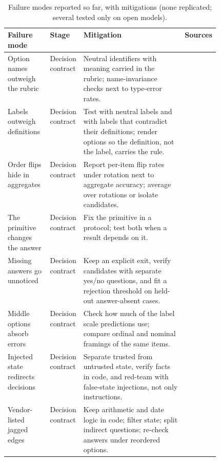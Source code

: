 \begin{table}[tbp]
\centering\footnotesize
\caption{Failure modes reported so far, with mitigations (none replicated; several tested only on open models).}\label{tab:failures}
\begin{tabularx}{\linewidth}{p{0.2\linewidth}p{0.12\linewidth}Xp{0.16\linewidth}}
\toprule
\textbf{Failure mode} & \textbf{Stage} & \textbf{Mitigation} & \textbf{Sources} \\
\midrule
Option names outweigh the rubric & Decision contract & Neutral identifiers with meaning carried in the rubric; name-invariance checks next to type-error rates. & \citep{arxiv2609_26758,arxiv2610_00346} \\
Labels outweigh definitions & Decision contract & Test with neutral labels and with labels that contradict their definitions; render options so the definition, not the label, carries the rule. & \citep{arxiv2610_02586,arxiv2610_03324} \\
Order flips hide in aggregates & Decision contract & Report per-item flip rates under rotation next to aggregate accuracy; average over rotations or isolate candidates. & \citep{gh_jujumilk3_jev_calibration_audit,arxiv2609_30454,arxiv2610_00831,arxiv2610_01601,typesafe2026jaggedness,arxiv2610_07327} \\
The primitive changes the answer & Decision contract & Fix the primitive in a protocol; test both when a result depends on it. & \citep{gh_jujumilk3_jev_calibration_audit,gh_jjd_lab_jev_synthetic_survey,arxiv2609_37470,arxiv2609_35342} \\
Missing answers go unnoticed & Decision contract & Keep an explicit exit, verify candidates with separate yes/\allowbreak{}no questions, and fit a rejection threshold on held-out answer-absent cases. & \citep{arxiv2609_39496,arxiv2610_03387,arxiv2609_34024,gh_jujumilk3_jev_calibration_audit,arxiv2610_07730} \\
Middle options absorb errors & Decision contract & Check how much of the label scale predictions use; compare ordinal and nominal framings of the same items. & \citep{arxiv2609_38827} \\
Injected state redirects decisions & Decision contract & Separate trusted from untrusted state, verify facts in code, and red-team with false-state injections, not only instructions. & \citep{arxiv2609_28613,arxiv2610_04985,arxiv2609_30243,arxiv2609_31142} \\
Vendor-listed jagged edges & Decision contract & Keep arithmetic and date logic in code; filter state; split indirect questions; re-check answers under reordered options. & \citep{typesafe2026jaggedness} \\

\end{tabularx}
\end{table}

